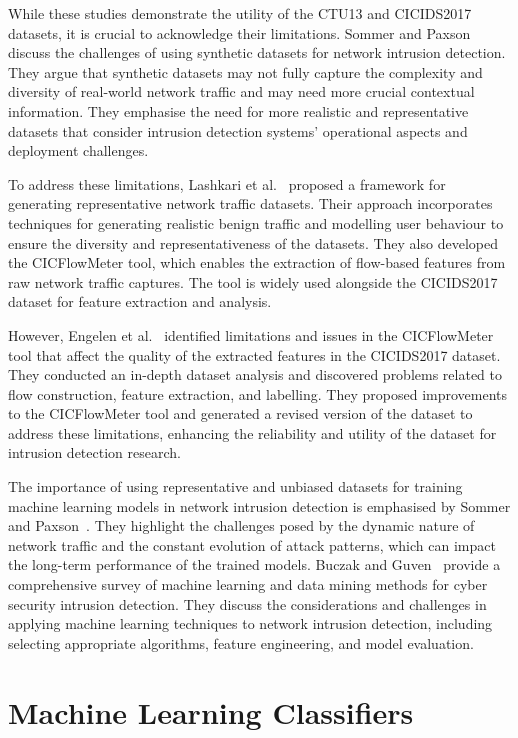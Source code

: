 While these studies demonstrate the utility of the CTU13 and CICIDS2017 datasets, it is crucial to acknowledge their limitations. Sommer and Paxson~\cite{sommer2010outside} discuss the challenges of using synthetic datasets for network intrusion detection. They argue that synthetic datasets may not fully capture the complexity and diversity of real-world network traffic and may need more crucial contextual information. They emphasise the need for more realistic and representative datasets that consider intrusion detection systems' operational aspects and deployment challenges.

To address these limitations, Lashkari et al.~\cite{lashkari2017characterization} proposed a framework for generating representative network traffic datasets. Their approach incorporates techniques for generating realistic benign traffic and modelling user behaviour to ensure the diversity and representativeness of the datasets. They also developed the CICFlowMeter tool, which enables the extraction of flow-based features from raw network traffic captures. The tool is widely used alongside the CICIDS2017 dataset for feature extraction and analysis.

However, Engelen et al.~\cite{engelen2021troubleshooting} identified limitations and issues in the CICFlowMeter tool that affect the quality of the extracted features in the CICIDS2017 dataset. They conducted an in-depth dataset analysis and discovered problems related to flow construction, feature extraction, and labelling. They proposed improvements to the CICFlowMeter tool and generated a revised version of the dataset to address these limitations, enhancing the reliability and utility of the dataset for intrusion detection research.

The importance of using representative and unbiased datasets for training machine learning models in network intrusion detection is emphasised by Sommer and Paxson~\cite{sommer2010outside}. They highlight the challenges posed by the dynamic nature of network traffic and the constant evolution of attack patterns, which can impact the long-term performance of the trained models. Buczak and Guven~\cite{buczak2015survey} provide a comprehensive survey of machine learning and data mining methods for cyber security intrusion detection. They discuss the considerations and challenges in applying machine learning techniques to network intrusion detection, including selecting appropriate algorithms, feature engineering, and model evaluation.

\section{Machine Learning Classifiers}\label{sec:classifiers}

